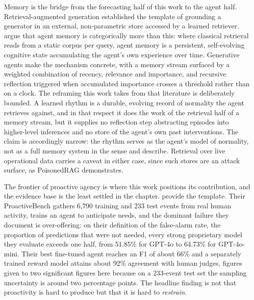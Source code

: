 Memory is the bridge from the forecasting half of this work to the agent half.
Retrieval-augmented generation \citep{lewis_retrieval-augmented_2020} established
the template of grounding a generator in an external, non-parametric store
accessed by a learned retriever. \citet[a 2026 preprint]{hu_memory_2026} argue
that agent memory is categorically more than this: where classical retrieval
reads from a static corpus per query, agent memory is a persistent,
self-evolving cognitive state accumulating the agent's own experience over time.
Generative agents \citep{park_generative_2023} make the mechanism concrete, with
a memory stream surfaced by a weighted combination of recency, relevance and
importance, and recursive reflection triggered when accumulated importance
crosses a threshold rather than on a clock. The reframing this work takes from
that literature is deliberately bounded. A learned rhythm is a durable, evolving
record of normality the agent retrieves against, and in that respect it does the
work of the retrieval half of a memory stream, but it supplies no reflection step
abstracting episodes into higher-level inferences and no store of the agent's own
past interventions. The claim is accordingly narrow: the rhythm serves as the
agent's model of normality, not as a full memory system in the sense
\citet{hu_memory_2026} and \citet{park_generative_2023} describe. Retrieval over
live operational data carries a caveat in either case, since such stores are an
attack surface, as PoisonedRAG \citep{zou_poisonedrag_2025} demonstrates.

The frontier of proactive agency is where this work positions its contribution,
and the evidence base is the least settled in the chapter.
\citet[a 2024 preprint]{lu_proactive_2024} provide the template. Their
ProactiveBench gathers 6,790 training and 233 test events from real human
activity, trains an agent to anticipate needs, and the dominant failure they
document is over-offering: on their definition of the false-alarm rate, the
proportion of predictions that were not needed, every strong proprietary model
they evaluate exceeds one half, from 51.85\% for GPT-4o to 64.73\% for
GPT-4o-mini. Their best fine-tuned agent reaches an F1 of about 66\% and a
separately trained reward model attains about 92\% agreement with human judges,
figures given to two significant figures here because on a 233-event test set the
sampling uncertainty is around two percentage points. The headline finding is not
that proactivity is hard to produce but that it is hard to \emph{restrain}.

